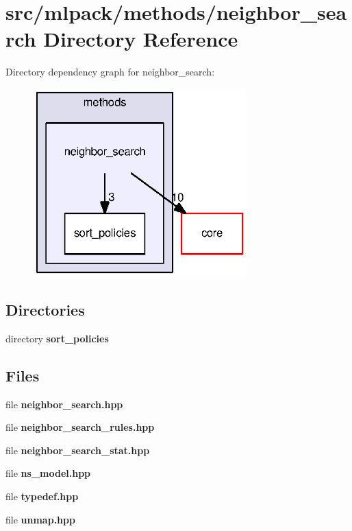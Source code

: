 \section{src/mlpack/methods/neighbor\+\_\+search Directory Reference}
\label{dir_1d65ca8da19f261ef402f02c2090e4b8}
Directory dependency graph for neighbor\+\_\+search\+:
\nopagebreak
\begin{figure}[H]
\begin{center}
\leavevmode
\includegraphics[width=234pt]{dir_1d65ca8da19f261ef402f02c2090e4b8_dep}
\end{center}
\end{figure}
\subsection*{Directories}
\begin{DoxyCompactItemize}
\item 
directory {\bf sort\+\_\+policies}
\end{DoxyCompactItemize}
\subsection*{Files}
\begin{DoxyCompactItemize}
\item 
file {\bf neighbor\+\_\+search.\+hpp}
\item 
file {\bf neighbor\+\_\+search\+\_\+rules.\+hpp}
\item 
file {\bf neighbor\+\_\+search\+\_\+stat.\+hpp}
\item 
file {\bf ns\+\_\+model.\+hpp}
\item 
file {\bf typedef.\+hpp}
\item 
file {\bf unmap.\+hpp}
\end{DoxyCompactItemize}
